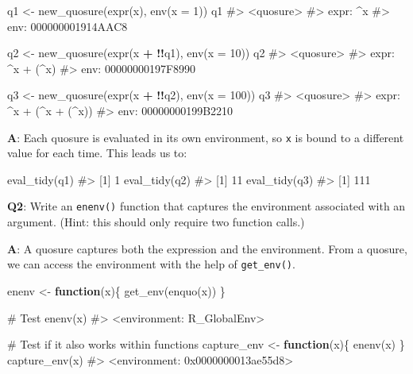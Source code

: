 \documentclass[
]{krantz}
\makeatletter
\newenvironment{Shaded}{\begin{snugshade}}{\end{snugshade}}
\newcommand{\CommentTok}[1]{\textcolor[rgb]{0.56,0.35,0.01}{\textit{#1}}}
\newcommand{\ControlFlowTok}[1]{\textcolor[rgb]{0.13,0.29,0.53}{\textbf{#1}}}
\newcommand{\DataTypeTok}[1]{\textcolor[rgb]{0.13,0.29,0.53}{#1}}
\newcommand{\DecValTok}[1]{\textcolor[rgb]{0.00,0.00,0.81}{#1}}
\newcommand{\KeywordTok}[1]{\textcolor[rgb]{0.13,0.29,0.53}{\textbf{#1}}}
\newcommand{\NormalTok}[1]{#1}
\newcommand{\OperatorTok}[1]{\textcolor[rgb]{0.81,0.36,0.00}{\textbf{#1}}}
\newcommand{\StringTok}[1]{\textcolor[rgb]{0.31,0.60,0.02}{#1}}
\newenvironment{kframe}{%
\medskip{}
\setlength{\fboxsep}{.8em}
 \def\at@end@of@kframe{}%
 \ifinner\ifhmode%
  \def\at@end@of@kframe{\end{minipage}}%
  \begin{minipage}{\columnwidth}%
 \fi\fi%
 \def\FrameCommand##1{\hskip\@totalleftmargin \hskip-\fboxsep
 \colorbox{shadecolor}{##1}\hskip-\fboxsep
     \hskip-\linewidth \hskip-\@totalleftmargin \hskip\columnwidth}%
 \MakeFramed {\advance\hsize-\width
   \@totalleftmargin\z@ \linewidth\hsize
   \@setminipage}}%
 {\par\unskip\endMakeFramed%
 \at@end@of@kframe}
\renewenvironment{Shaded}{\begin{kframe}}{\end{kframe}}
\renewcommand{\KeywordTok} [1]{\textcolor[rgb]{0.00,0.44,0.13}{{#1}}}
\renewcommand{\DataTypeTok}[1]{\textcolor[rgb]{0.56,0.13,0.00}{{#1}}}
\renewcommand{\DecValTok}  [1]{\textcolor[rgb]{0.25,0.63,0.44}{{#1}}}
\renewcommand{\StringTok}  [1]{\textcolor[rgb]{0.25,0.44,0.63}{{#1}}}
\renewcommand{\CommentTok} [1]{\textcolor[rgb]{0.38,0.63,0.69}{{#1}}}
\renewcommand{\NormalTok}  [1]{{#1}}
\makeatother
\begin{document}
\begin{Shaded}
\begin{Highlighting}[]
\NormalTok{q1 <-}\StringTok{ }\KeywordTok{new_quosure}\NormalTok{(}\KeywordTok{expr}\NormalTok{(x), }\KeywordTok{env}\NormalTok{(}\DataTypeTok{x =} \DecValTok{1}\NormalTok{))}
\NormalTok{q1}
\CommentTok{#> <quosure>}
\CommentTok{#> expr: ^x}
\CommentTok{#> env:  000000001914AAC8}

\NormalTok{q2 <-}\StringTok{ }\KeywordTok{new_quosure}\NormalTok{(}\KeywordTok{expr}\NormalTok{(x }\OperatorTok{+}\StringTok{ }\OperatorTok{!!}\NormalTok{q1), }\KeywordTok{env}\NormalTok{(}\DataTypeTok{x =} \DecValTok{10}\NormalTok{))}
\NormalTok{q2}
\CommentTok{#> <quosure>}
\CommentTok{#> expr: ^x + (^x)}
\CommentTok{#> env:  00000000197F8990}

\NormalTok{q3 <-}\StringTok{ }\KeywordTok{new_quosure}\NormalTok{(}\KeywordTok{expr}\NormalTok{(x }\OperatorTok{+}\StringTok{ }\OperatorTok{!!}\NormalTok{q2), }\KeywordTok{env}\NormalTok{(}\DataTypeTok{x =} \DecValTok{100}\NormalTok{))}
\NormalTok{q3}
\CommentTok{#> <quosure>}
\CommentTok{#> expr: ^x + (^x + (^x))}
\CommentTok{#> env:  00000000199B2210}
\end{Highlighting}
\end{Shaded}

\textbf{{A}}: Each quosure is evaluated in its own environment, so \texttt{x} is bound to a different value for each time. This leads us to:

\begin{Shaded}
\begin{Highlighting}[]
\KeywordTok{eval_tidy}\NormalTok{(q1)}
\CommentTok{#> [1] 1}
\KeywordTok{eval_tidy}\NormalTok{(q2)}
\CommentTok{#> [1] 11}
\KeywordTok{eval_tidy}\NormalTok{(q3)}
\CommentTok{#> [1] 111}
\end{Highlighting}
\end{Shaded}

\textbf{{Q2}}: Write an \texttt{enenv()} function that captures the environment associated with an argument. (Hint: this should only require two function calls.)

\textbf{{A}}: A quosure captures both the expression and the environment. From a quosure, we can access the environment with the help of \texttt{get\_env()}.

\begin{Shaded}
\begin{Highlighting}[]
\NormalTok{enenv <-}\StringTok{ }\ControlFlowTok{function}\NormalTok{(x)\{}
  \KeywordTok{get_env}\NormalTok{(}\KeywordTok{enquo}\NormalTok{(x))}
\NormalTok{\}}

\CommentTok{# Test}
\KeywordTok{enenv}\NormalTok{(x)}
\CommentTok{#> <environment: R_GlobalEnv>}

\CommentTok{# Test if it also works within functions}
\NormalTok{capture_env <-}\StringTok{ }\ControlFlowTok{function}\NormalTok{(x)\{}
  \KeywordTok{enenv}\NormalTok{(x)}
\NormalTok{\}}
\KeywordTok{capture_env}\NormalTok{(x)}
\CommentTok{#> <environment: 0x0000000013ae55d8>}
\end{Highlighting}
\end{Shaded}
\end{document}
